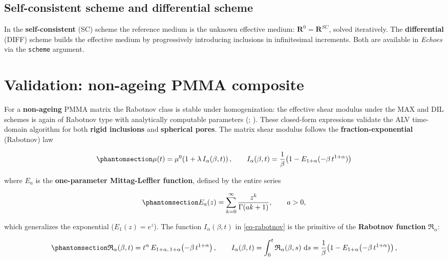 \documentclass[
  a4paper,
  numbers=noendperiod,
  DIV=12]{scrreprt}
\newcommand{\ud}{{\,\mathrm{d}}}
\begin{document}
\subsection{Self-consistent scheme and differential
scheme}\label{self-consistent-scheme-and-differential-scheme}

In the \textbf{self-consistent} (SC) scheme the reference medium is the
unknown effective medium: \(\mathbf{R}^0 = \mathbf{R}^{SC}\), solved
iteratively. The \textbf{differential} (DIFF) scheme builds the
effective medium by progressively introducing inclusions in
infinitesimal increments. Both are available in \emph{Echoes} via the
\texttt{scheme} argument.

\section{Validation: non-ageing PMMA
composite}\label{sec-laplace-validation}

For a \textbf{non-ageing} PMMA matrix the Rabotnov class is stable under
homogenization: the effective shear modulus under the MAX and DIL
schemes is again of Rabotnov type with analytically computable
parameters (;
). These
closed-form expressions validate the ALV time-domain algorithm for both
\textbf{rigid inclusions} and \textbf{spherical pores}. The matrix shear
modulus follows the \textbf{fraction-exponential} (Rabotnov) law

\begin{equation}\protect\phantomsection\label{eq-rabotnov}{
\mu(t) = \mu^0\!\left(1 + \lambda\,I_\alpha(\beta,t)\right),
\qquad
I_\alpha(\beta,t) = \frac{1}{\beta}\!\left(1 - E_{1+\alpha}(-\beta\,t^{1+\alpha})\right)
}\end{equation}

where \(E_a\) is the \textbf{one-parameter Mittag-Leffler function},
defined by the entire series

\begin{equation}\protect\phantomsection\label{eq-ml-def}{
E_a(z) = \sum_{k=0}^{\infty}\frac{z^k}{\Gamma(ak+1)}, \qquad a>0,
}\end{equation}

which generalizes the exponential (\(E_1(z)=e^z\)). The function
\(I_\alpha(\beta,t)\) in \ref{eq-rabotnov} is the primitive of the
\textbf{Rabotnov function} \(\mathfrak{R}_\alpha\):

\begin{equation}\protect\phantomsection\label{eq-rabotnov-primitive}{
\mathfrak{R}_\alpha(\beta,t)
  = t^{\alpha}\,E_{1+\alpha,\,1+\alpha}\!\left(-\beta\,t^{1+\alpha}\right),
\qquad
I_\alpha(\beta,t)
  = \int_0^t \mathfrak{R}_\alpha(\beta,s)\,\ud s
  = \frac{1}{\beta}\!\left(1 - E_{1+\alpha}\!\left(-\beta\,t^{1+\alpha}\right)\right),
}\end{equation}
\end{document}
